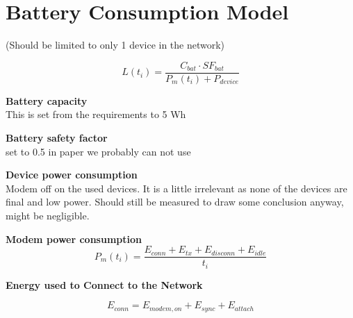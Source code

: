 \section{Battery Consumption Model}
(Should be limited to only 1 device in the network)

\begin{equation}
L(t_i) = \frac{C_{bat}\cdot SF_{bat}}{P_m(t_i) + P_{device}}
\end{equation}
\begin{where}
\end{where}

\textbf{Battery capacity}\\
This is set from the requirements to 5 Wh

\textbf{Battery safety factor}\\
set to 0.5 in paper we probably can not use

\textbf{Device power consumption}\\
Modem off on the used devices. It is a little irrelevant as none of the devices are final and low power. Should still be measured to draw some conclusion anyway, might be negligible.

\textbf{Modem power consumption}\\

\begin{equation}
P_m(t_i) = \frac{E_{conn} + E_{tx} + E_{disconn} + E_{idle}}{t_i}
\end{equation}
\begin{where}
\end{where}

\textbf{Energy used to Connect to the Network}

\begin{equation}
E_{conn} = E_{modem,on} + E_{sync} + E_{attach}
\end{equation}

